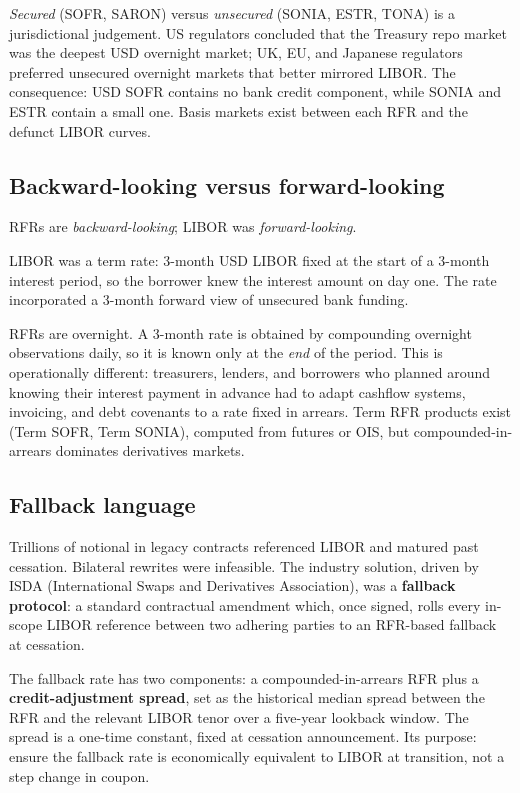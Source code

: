 \emph{Secured} (SOFR, SARON) versus \emph{unsecured} (SONIA,
ESTR, TONA) is a jurisdictional judgement.  US regulators
concluded that the Treasury repo market was the deepest USD
overnight market; UK, EU, and Japanese regulators preferred
unsecured overnight markets that better mirrored LIBOR.  The
consequence: USD SOFR contains no bank credit component, while
SONIA and ESTR contain a small one.  Basis markets exist between
each RFR and the defunct LIBOR curves.

\subsection{Backward-looking versus forward-looking}

RFRs are \emph{backward-looking}; LIBOR was
\emph{forward-looking}.

LIBOR was a term rate: 3-month USD LIBOR fixed at the start of a
3-month interest period, so the borrower knew the interest amount
on day one.  The rate incorporated a 3-month forward view of
unsecured bank funding.

RFRs are overnight.  A 3-month rate is obtained by compounding
overnight observations daily, so it is known only at the
\emph{end} of the period.  This is operationally different:
treasurers, lenders, and borrowers who planned around knowing
their interest payment in advance had to adapt cashflow systems,
invoicing, and debt covenants to a rate fixed in arrears.  Term
RFR products exist (Term SOFR, Term SONIA), computed from futures
or OIS, but compounded-in-arrears dominates derivatives markets.

\subsection{Fallback language}

Trillions of notional in legacy contracts referenced LIBOR and
matured past cessation.  Bilateral rewrites were infeasible.  The
industry solution, driven by ISDA (International Swaps and
Derivatives Association), was a \textbf{fallback protocol}: a
standard contractual amendment which, once signed, rolls every
in-scope LIBOR reference between two adhering parties to an
RFR-based fallback at cessation.

The fallback rate has two components: a compounded-in-arrears RFR
plus a \textbf{credit-adjustment spread}, set as the historical
median spread between the RFR and the relevant LIBOR tenor over a
five-year lookback window.  The spread is a one-time constant,
fixed at cessation announcement.  Its purpose: ensure the
fallback rate is economically equivalent to LIBOR at transition,
not a step change in coupon.


